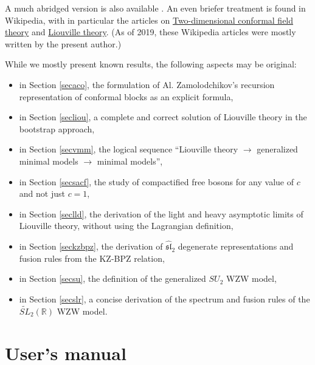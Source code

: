 \documentclass[12pt, a4paper, notitlepage, twoside]{report}
\numberwithin{equation}{section}
\theoremstyle{break}
\begin{document}
A much abridged version is also available \cite{rib16}. An even briefer treatment is found in Wikipedia, with in particular the articles on \href{https://en.wikipedia.org/wiki/Two-dimensional_conformal_field_theory}{Two-dimensional conformal field theory} and \href{https://en.wikipedia.org/wiki/Liouville_field_theory}{Liouville theory}. (As of 2019, these Wikipedia articles were mostly written by the present author.)

While we mostly present known results, the following aspects may be original:
\begin{itemize}
\item in Section \ref{secaco}, the formulation of Al. Zamolodchikov's recursion representation of conformal blocks as an explicit formula,
\item in Section \ref{secliou}, a complete and correct solution of Liouville theory in the bootstrap approach, 
\item in Section \ref{secvmm}, the logical sequence ``Liouville theory $\rightarrow$ generalized minimal models $\rightarrow$ minimal models'',
\item in Section \ref{secsacf}, the study of compactified free bosons for any value of $c$ and not just $c=1$,
\item in Section \ref{seclld}, the derivation of the light and heavy asymptotic limits of Liouville theory, without using the Lagrangian definition,
\item in Section \ref{seckzbpz}, the derivation of $\widehat{\mathfrak{sl}}_2$ degenerate representations and fusion rules from the KZ-BPZ relation,
\item in Section \ref{secsu}, the definition of the generalized $SU_2$ WZW model,
\item in Section \ref{secslr}, a concise derivation of the spectrum and fusion rules of the $\widetilde{SL}_2(\mathbb{R})$ WZW model.
\end{itemize}


\section{User's manual}
\end{document}
